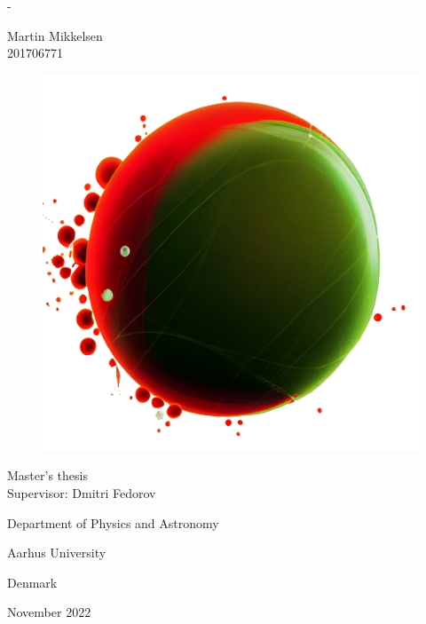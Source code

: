 \begin{titlingpage}
\newlength{\frontpagecorrection}
\calccentering{\frontpagecorrection}
\begin{adjustwidth*}{\frontpagecorrection}{-\frontpagecorrection}
	
	\centering
	\sffamily
	
	\vspace*{0.1cm}
	
	\fontsize{22pt}{25pt}\selectfont
	
	\textsc{\projecttitle}
	 \par
	\vspace{0.8cm}
	
	\fontsize{18pt}{22pt}\selectfont
	
	Martin Mikkelsen \\
	201706771 \par
	
	\vspace{1cm}

	\begin{center}
	\begin{figure}[H]
		\centering
		\hspace*{4cm}
		\includegraphics[width=0.75\linewidth]{Figures/Pion-NucleonSystem.png}
		\label{fig:pion-nucleonsystem}
	\end{figure}
	\end{center}
			
	\vspace{1cm}
	
	Master's thesis \\
	Supervisor: Dmitri Fedorov
	\vspace{1.0cm}
	
	\fontsize{13pt}{14pt}\selectfont
	
	Department of Physics and Astronomy\par
	Aarhus University\par
	Denmark
	
	\vspace{0.3cm}
	
	November 2022
	
\end{adjustwidth*}
\end{titlingpage}


